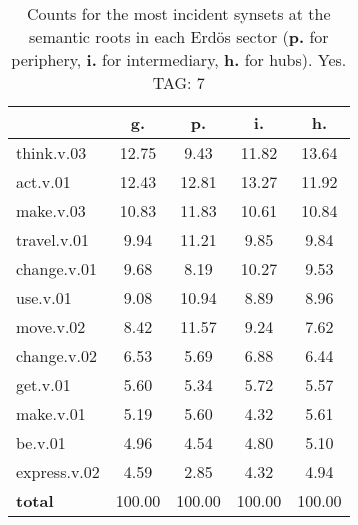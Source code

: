 \begin{table}[h!]
\begin{center}
\begin{tabular}{| l | c | c | c | c |}\hline
 & g. & p. & i. & h. \\\hline
think.v.03 & 12.75  & 9.43  & 11.82  & 13.64 \\\hline
act.v.01 & 12.43  & 12.81  & 13.27  & 11.92 \\\hline
make.v.03 & 10.83  & 11.83  & 10.61  & 10.84 \\\hline
travel.v.01 & 9.94  & 11.21  & 9.85  & 9.84 \\\hline
change.v.01 & 9.68  & 8.19  & 10.27  & 9.53 \\\hline
use.v.01 & 9.08  & 10.94  & 8.89  & 8.96 \\\hline
move.v.02 & 8.42  & 11.57  & 9.24  & 7.62 \\\hline
change.v.02 & 6.53  & 5.69  & 6.88  & 6.44 \\\hline
get.v.01 & 5.60  & 5.34  & 5.72  & 5.57 \\\hline
make.v.01 & 5.19  & 5.60  & 4.32  & 5.61 \\\hline
be.v.01 & 4.96  & 4.54  & 4.80  & 5.10 \\\hline
express.v.02 & 4.59  & 2.85  & 4.32  & 4.94 \\\hline
{{\bf total}} & 100.00  & 100.00  & 100.00  & 100.00 \\\hline
\end{tabular}
\caption{Counts for the most incident synsets at the semantic roots in each Erd\"os sector ({\bf p.} for periphery, {\bf i.} for intermediary, {\bf h.} for hubs). Yes. TAG: 7}
\end{center}
\end{table}